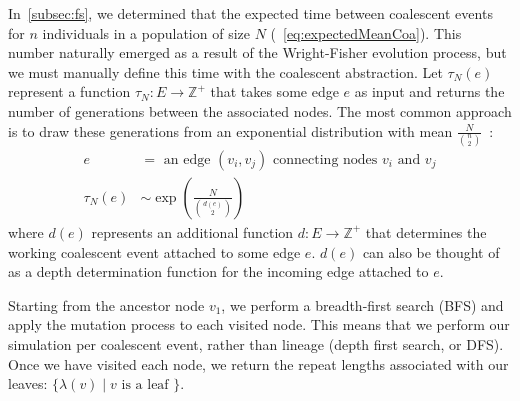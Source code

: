 In~\autoref{subsec:fs}, we determined that the expected time between coalescent events for $n$ individuals in a
population of size $N$ (~\autoref{eq:expectedMeanCoa}).
This number naturally emerged as a result of the Wright-Fisher evolution process, but we must manually define this time
with the coalescent abstraction.
Let $\tau_N(e)$ represent a function $\tau_N : E \rightarrow \mathbb{Z}^+$ that takes some edge $e$ as input and returns
the number of generations between the associated nodes.
The most common approach is to draw these generations from an exponential distribution with mean
$\frac{N}{\binom{n}{2}}$~\cite{hudsonGeneGenealogiesCoalescent1990}:
\begin{align}
    e &= \text{ an edge } (v_i, v_j) \text{ connecting nodes } v_i \text{ and } v_j \\
    \tau_N(e) &\sim \exp\left(\frac{N}{\binom{d(e)}{2}}\right)
\end{align}
where $d(e)$ represents an additional function $d : E \rightarrow \mathbb{Z}^+$ that determines the working coalescent
event attached to some edge $e$.
$d(e)$ can also be thought of as a depth determination function for the incoming edge attached to $e$.

Starting from the ancestor node $v_1$, we perform a breadth-first search (BFS) and apply the mutation process to each
visited node.
This means that we perform our simulation per coalescent event, rather than lineage (depth first search, or DFS).
Once we have visited each node, we return the repeat lengths associated with our leaves: $\{ \lambda (v) \mid v
\text{ is a leaf }\}$.

